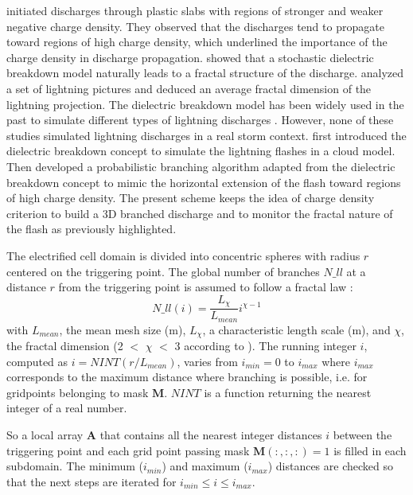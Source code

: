 \citet{Williams-1985} initiated discharges through plastic slabs with regions of stronger and weaker negative charge density. 
They observed that the discharges tend to propagate toward regions of high charge density, which underlined the importance of the charge density in discharge propagation. 
\citet{Niemeyer-1984} showed that a stochastic dielectric breakdown model naturally leads to a fractal structure of the discharge. 
\citet{Tsonis-1987} analyzed a set of lightning pictures and deduced an average fractal dimension of the lightning projection. 
The dielectric breakdown model  has been widely used in the past to simulate different types of lightning discharges \citep[among others]{Wiesmann-1986,Wiesmann-1988,Petrov-1993,Sanudo-1995,Kawasaki-2000}. 
However, none of these studies simulated lightning discharges in a real storm context.  
\citet{Mansell-2002} first introduced the dielectric breakdown concept to simulate the lightning flashes in a cloud model. 
Then \citet{Barthe-Pinty-2007-3cas} developed a probabilistic branching algorithm adapted from the dielectric breakdown concept to mimic the horizontal extension of the flash toward regions of high charge density. 
The present scheme keeps the idea of charge density criterion to build a 3D branched discharge \citep{Williams-1985} and to monitor the fractal nature of the flash \citep{Niemeyer-1984} as previously highlighted.

The electrified cell domain is divided into concentric spheres with radius $r$ centered on the triggering point. 
The global number of branches $N\_ll$ at a distance $r$ from the triggering point is assumed to follow a fractal law \citep{Niemeyer-1984}:
\begin{equation}
  N\_ll(i) = \frac{L_{\chi}}{L_{mean}}i^{\chi - 1}
\label{eq:eq_frac}
\end{equation}
with $L_{mean}$, the mean mesh size (m), $L_{\chi}$, a characteristic length scale (m), and $\chi$, the fractal dimension (2 $<$ $\chi$ $<$ 3 according to \cite{Petrov-1993}). 
The running integer $i$, computed as $i = NINT(r / L_{mean})$, varies from $i_{min}=0$ to $i_{max}$ where $i_{max}$ corresponds to the maximum distance where branching is possible, i.e. for gridpoints belonging to mask $\mathbf{M}$. 
$NINT$ is a function returning the nearest integer of a real number.

So a local array $\mathbf{A}$ that contains all the nearest integer distances $i$ between the triggering point and each grid point passing mask $\mathbf{M}(:,:,:) = 1$ is filled in each subdomain.
The minimum ($i_{min}$) and maximum ($i_{max}$) distances are checked so that the next steps are iterated for $i_{min} \leq i \leq i_{max}$. 

